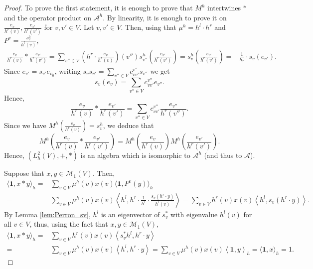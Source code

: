 \documentclass[10pt,11pt]{amsart}%
\begin{document}
\begin{proof}
To prove the first statement, it is enough to prove that $M^h$ intertwines $*$ and the operator product on $\mathcal{A}^h$. By linearity, it is enough to prove it on $\frac{e_v}{h^r(v)},\frac{e_{v'}}{h^r(v')}$ for $v,v'\in V$. Let $v,v'\in V$. Then, using that $\mu^h=h^l\cdot h^r$ and $P^v=\frac{s^h_v}{h^l(v)}$,
\begin{align*}
\frac{e_v}{h^r(v)}*\frac{e_{v'}}{h^r(v')}=\sum_{v''\in V}\left(h^r\cdot \frac{e_v}{h^r(v)}\right)(v'')s_{v''}^h\left(\frac{e_{v'}}{h^r(v')}\right)=s_v^h\left(\frac{e_{v'}}{h^r(v')}\right)=&\frac{1}{h_r}\cdot s_v(e_{v'}).
\end{align*}
Since $e_{v'}=s_{v'}e_{v_0}$, writing $s_{v}s_{v'}=\sum_{v''\in V}c_{vv'}^{v''}s_{v''}$ we get 
$$s_{v}(e_v)=\sum_{v''\in V}c_{vv'}^{v''}e_{v''}.$$
Hence,
$$\frac{e_v}{h^r(v)}*\frac{e_{v'}}{h^r(v')}=\sum_{v''\in V}c_{vv'}^{v''}\frac{e_{v''}}{h^r(v'')}.$$
Since we have $M^h\left(\frac{e_v}{h^r(v)}\right)=s_v^h$, we deduce that 
$$M^h\left(\frac{e_v}{h^r(v)}*\frac{e_{v'}}{h^r(v')}\right)=M^h\left(\frac{e_v}{h^r(v)}\right)M^h\left(\frac{e_{v'}}{h^r(v')}\right).$$
Hence, $(L^2_h(V),+,*)$ is an algebra which is isomorphic to $\mathcal{A}^h$ (and thus to $\mathcal{A}$).

Suppose that $x,y\in \mathcal{M}_1(V)$. Then,
\begin{align*}
\langle \mathbf{1},x\ast y\rangle_h=&\sum_{v\in V}\mu^h(v)x(v)\langle \mathbf{1},P^v(y)\rangle_h\\
=&\sum_{v\in V}\mu^h(v)x(v)\left\langle h^l,h^r\cdot \frac{1}{h^r}\cdot \frac{s_v(h^r\cdot y)}{h^l(v)}\right\rangle=\sum_{v\in V}h^r(v)x(v)\left\langle h^l,s_v(h^r\cdot y)\right\rangle.
\end{align*}
By Lemma \ref{lem:Perron_sv}, $h^l$ is an eigenvector of $s_v^*$ with eigenvalue $h^l(v)$ for all $v\in V$, thus, using the fact that $x,y\in\mathcal{M}_{1}(V)$,
\begin{align*}
\langle \mathbf{1},x\ast y\rangle_h=&\sum_{v\in V}h^r(v)x(v)\left\langle s_v^*h^l,h^r\cdot y\right\rangle\\
=&\sum_{v\in V}\mu^h(v)x(v)\left\langle h^l,h^r\cdot y\right\rangle=\sum_{v\in V}\mu^h(v)x(v)\left\langle \mathbf{1},y\right\rangle_{h}=\langle \mathbf{1},x\rangle_{h}=1.
\end{align*}

\end{proof}
\end{document}
